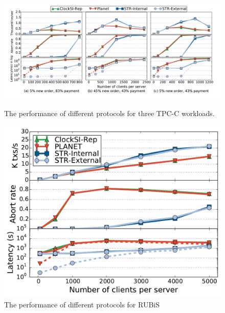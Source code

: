 \begin{figure}
\centering
\begin{minipage}{.72\textwidth}
\centering
  \includegraphics[scale=0.3]{figures/tpcc}
  \vspace{-5mm}
  \caption{The performance of different protocols for three TPC-C workloads.}
  \label{fig:tpcc}
\end{minipage}
\begin{minipage}{.26\textwidth}
\centering
  \includegraphics[scale=0.28]{figures/rubislatencywarehouse}
  \vspace{-2mm}
  \caption{The performance of different protocols for RUBiS}
  \label{fig:rubis}
\end{minipage}
\end{figure}

